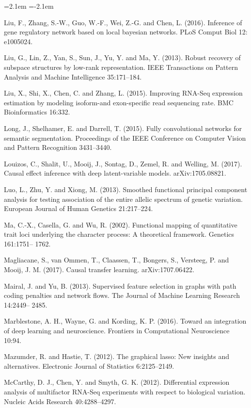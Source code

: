 \begin{list}{}{\leftmargin=2.1em  
  \itemindent=-2.1em \parsep=0pt \itemsep=2pt \topsep=0pt}
\item Liu, F., Zhang, S.-W., Guo, W.-F., Wei, Z.-G. and Chen, L. (2016). Inference of gene regulatory network based on local bayesian networks. PLoS Comput Biol 12: e1005024.
\item Liu, G., Lin, Z., Yan, S., Sun, J., Yu, Y. and Ma, Y. (2013). Robust recovery of subspace structures by low-rank representation. IEEE Transactions on Pattern Analysis and Machine Intelligence 35:171--184.
\item Liu, X., Shi, X., Chen, C. and Zhang, L. (2015). Improving RNA-Seq expression estimation by modeling isoform-and exon-specific read sequencing rate. BMC Bioinformatics 16:332.
\item Long, J., Shelhamer, E. and Darrell, T. (2015). Fully convolutional networks for semantic segmentation. Proceedings of the IEEE Conference on Computer Vision and Pattern Recognition 3431--3440.
\item Louizos, C., Shalit, U., Mooij, J., Sontag, D., Zemel, R. and Welling, M. (2017). Causal effect inference with deep latent-variable models. arXiv:1705.08821.
\item Luo, L., Zhu, Y. and Xiong, M. (2013). Smoothed functional principal component analysis for testing association of the entire allelic spectrum of genetic variation. European Journal of Human Genetics 21:217--224.
\item Ma, C.-X., Casella, G. and Wu, R. (2002). Functional mapping of quantitative trait loci underlying the character process: A theoretical framework. Genetics 161:1751-- 1762.
\item Magliacane, S., van Ommen, T., Claassen, T., Bongers, S., Versteeg, P. and Mooij, J. M. (2017). Causal transfer learning. arXiv:1707.06422.
\item Mairal, J. and Yu, B. (2013). Supervised feature selection in graphs with path coding penalties and network flows. The Journal of Machine Learning Research 14:2449-- 2485.
\item Marblestone, A. H., Wayne, G. and Kording, K. P. (2016). Toward an integration of deep learning and neuroscience. Frontiers in Computational Neuroscience 10:94.
\item Mazumder, R. and Hastie, T. (2012). The graphical lasso: New insights and alternatives. Electronic Journal of Statistics 6:2125--2149.
\item McCarthy, D. J., Chen, Y. and Smyth, G. K. (2012). Differential expression analysis of multifactor RNA-Seq experiments with respect to biological variation. Nucleic Acids Research 40:4288--4297.

\end{list}
